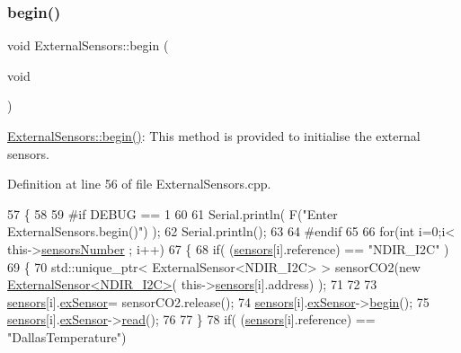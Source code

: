 \subsubsection{\texorpdfstring{begin()}{begin()}}
{\footnotesize\ttfamily void External\+Sensors\+::begin (\begin{DoxyParamCaption}\item[{void}]{ }\end{DoxyParamCaption})}

\hyperlink{class_external_sensors_a58ede0d786a86417254708870f04a21e}{External\+Sensors\+::begin()}\+: This method is provided to initialise the external sensors. 

Definition at line 56 of file External\+Sensors.\+cpp.


\begin{DoxyCode}
57 \{
58 
59 \textcolor{preprocessor}{#if DEBUG == 1}
60 
61     Serial.println( F(\textcolor{stringliteral}{"Enter ExternalSensors.begin()"}) );
62     Serial.println();
63 
64 \textcolor{preprocessor}{#endif }
65 
66     \textcolor{keywordflow}{for}(\textcolor{keywordtype}{int} i=0;i< this->\hyperlink{class_external_sensors_a58e4fbf9adeae787d92be5fa33043b5d}{sensorsNumber} ; i++)
67     \{
68         \textcolor{keywordflow}{if}( (\hyperlink{class_external_sensors_a284233f884fcf00154a44740cf1d9e1e}{sensors}[i].reference) == \textcolor{stringliteral}{"NDIR\_I2C"} )
69         \{   
70             std::unique\_ptr< ExternalSensor<NDIR\_I2C> > sensorCO2(\textcolor{keyword}{new} 
      \hyperlink{class_external_sensor_3_01_n_d_i_r___i2_c_01_4}{ExternalSensor<NDIR\_I2C>}( this->\hyperlink{class_external_sensors_a284233f884fcf00154a44740cf1d9e1e}{sensors}[i].address) );
71 
72 
73             \hyperlink{class_external_sensors_a284233f884fcf00154a44740cf1d9e1e}{sensors}[i].\hyperlink{struct_external_sensors_1_1sensor_a9bca150fd468b8d0e090e6d72c5c2b48}{exSensor}= sensorCO2.release();
74             \hyperlink{class_external_sensors_a284233f884fcf00154a44740cf1d9e1e}{sensors}[i].\hyperlink{struct_external_sensors_1_1sensor_a9bca150fd468b8d0e090e6d72c5c2b48}{exSensor}->\hyperlink{class_base_external_sensor_a87d132803d4f4fdd4e66332809f0c9a0}{begin}();
75             \hyperlink{class_external_sensors_a284233f884fcf00154a44740cf1d9e1e}{sensors}[i].\hyperlink{struct_external_sensors_1_1sensor_a9bca150fd468b8d0e090e6d72c5c2b48}{exSensor}->\hyperlink{class_base_external_sensor_a1564f16deacf57b51b9948ac29db4291}{read}();
76 
77         \}
78         \textcolor{keywordflow}{if}( (\hyperlink{class_external_sensors_a284233f884fcf00154a44740cf1d9e1e}{sensors}[i].reference) == \textcolor{stringliteral}{"DallasTemperature"})

\end{DoxyCode}
